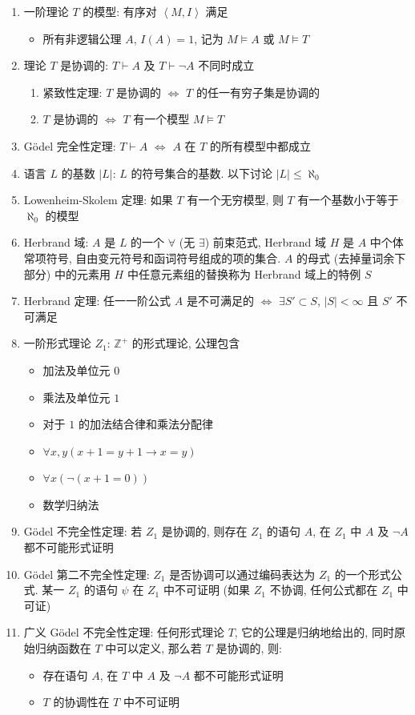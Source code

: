 \documentclass[11pt,a4paper,twocolumn,fleqn]{article} %
\begin{document}
\begin{enumerate}
\begin{enumerate}
	\end{enumerate}
	\item 一阶理论 $T$ 的模型: 有序对 $\left\langle M, I\right\rangle$ 满足
	\begin{itemize}
		\item 所有非逻辑公理 $A$, $I(A) = 1$, 记为 $M \models A$ 
		或 $M \models T$
	\end{itemize}
	\item 理论 $T$ 是协调的: $T\vdash A$ 及 $T\vdash\lnot A$ 不同时成立
	\begin{enumerate}
		\item 紧致性定理: $T$ 是协调的 $\Leftrightarrow$ $T$ 
		的任一有穷子集是协调的
		\item $T$ 是协调的 $\Leftrightarrow$ $T$ 有一个模型 $M\models T$
	\end{enumerate}
	\item G\"odel 完全性定理: $T\vdash A$ $\Leftrightarrow$ 
	$A$ 在 $T$ 的所有模型中都成立
	\item 语言 $L$ 的基数 $|L|$: $L$ 的符号集合的基数. 以下讨论 $|L|\le \aleph_0$
	\item Lowenheim-Skolem 定理: 如果 $T$ 有一个无穷模型, 
	则 $T$ 有一个基数小于等于 $\aleph_0$ 的模型
	\item Herbrand 域: $A$ 是 $L$ 的一个 $\forall$ (无 $\exists$) 前束范式, 
	Herbrand 域 $H$ 是 $A$ 中个体常项符号, 自由变元符号和函词符号组成的项的集合. 
	$A$ 的母式 (去掉量词余下部分) 中的元素用 $H$ 中任意元素组的替换称为 Herbrand
	域上的特例 $S$
	\item Herbrand 定理: 任一一阶公式 $A$ 是不可满足的 $\Leftrightarrow$ 
	$\exists S'\subset S$, $|S|<\infty$ 且 $S'$ 不可满足
	\item 一阶形式理论 $Z_1$: $\mathbb Z^+$ 的形式理论, 公理包含
	\begin{itemize}
		\item 加法及单位元 $0$
		\item 乘法及单位元 $1$
		\item 对于 $1$ 的加法结合律和乘法分配律
		\item $\forall x, y(x+1=y+1\to x=y)$
		\item $\forall x (\lnot(x+1=0))$
		\item 数学归纳法
	\end{itemize}
	\item G\"odel 不完全性定理: 若 $Z_1$ 是协调的, 则存在 $Z_1$ 的语句 $A$, 
	在 $Z_1$ 中 $A$ 及 $\lnot A$ 都不可能形式证明
	\item G\"odel 第二不完全性定理: $Z_1$ 是否协调可以通过编码表达为 $Z_1$ 
	的一个形式公式. 某一 $Z_1$ 的语句 $\psi$ 在 $Z_1$ 中不可证明 
	(如果 $Z_1$ 不协调, 任何公式都在 $Z_1$ 中可证)
	\item 广义 G\"odel 不完全性定理: 任何形式理论 $T$, 它的公理是归纳地给出的, 
	同时原始归纳函数在 $T$ 中可以定义, 那么若 $T$ 是协调的, 则: 
	\begin{itemize}
		\item 存在语句 $A$, 在 $T$ 中 $A$ 及 $\lnot A$ 都不可能形式证明
		\item $T$ 的协调性在 $T$ 中不可证明
	\end{itemize}
\end{enumerate}
\end{document}
